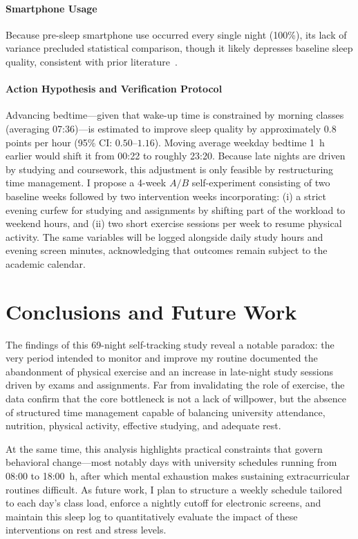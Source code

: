 \documentclass[conference]{IEEEtran}
\begin{document}
\paragraph{Smartphone Usage}
Because pre-sleep smartphone use occurred every single night (100\%), its lack of variance precluded statistical comparison, though it likely depresses baseline sleep quality, consistent with prior literature~\cite{ref10,ref11,ref12}.

\paragraph{Action Hypothesis and Verification Protocol}
Advancing bedtime—given that wake-up time is constrained by morning classes (averaging 07:36)—is estimated to improve sleep quality by approximately $0.8$ points per hour (95\% CI: $0.50$--$1.16$). Moving average weekday bedtime 1~h earlier would shift it from 00:22 to roughly 23:20. Because late nights are driven by studying and coursework, this adjustment is only feasible by restructuring time management. I propose a 4-week $A/B$ self-experiment consisting of two baseline weeks followed by two intervention weeks incorporating: (i) a strict evening curfew for studying and assignments by shifting part of the workload to weekend hours, and (ii) two short exercise sessions per week to resume physical activity. The same variables will be logged alongside daily study hours and evening screen minutes, acknowledging that outcomes remain subject to the academic calendar.

\section{Conclusions and Future Work}
The findings of this 69-night self-tracking study reveal a notable paradox: the very period intended to monitor and improve my routine documented the abandonment of physical exercise and an increase in late-night study sessions driven by exams and assignments. Far from invalidating the role of exercise, the data confirm that the core bottleneck is not a lack of willpower, but the absence of structured time management capable of balancing university attendance, nutrition, physical activity, effective studying, and adequate rest.

At the same time, this analysis highlights practical constraints that govern behavioral change—most notably days with university schedules running from 08:00 to 18:00~h, after which mental exhaustion makes sustaining extracurricular routines difficult. As future work, I plan to structure a weekly schedule tailored to each day's class load, enforce a nightly cutoff for electronic screens, and maintain this sleep log to quantitatively evaluate the impact of these interventions on rest and stress levels.
\end{document}
